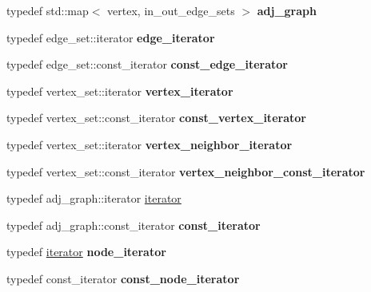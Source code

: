 \begin{DoxyCompactItemize}
typedef std\+::map$<$ vertex, in\+\_\+out\+\_\+edge\+\_\+sets $>$ {\bfseries adj\+\_\+graph}
\item 
\mbox{\label{class_n_graph_1_1t_graph_a1b710c759e101724f3544b374ebb0179}} 
typedef edge\+\_\+set\+::iterator {\bfseries edge\+\_\+iterator}
\item 
\mbox{\label{class_n_graph_1_1t_graph_a6e189d2dd98fbe980b830d898eea5247}} 
typedef edge\+\_\+set\+::const\+\_\+iterator {\bfseries const\+\_\+edge\+\_\+iterator}
\item 
\mbox{\label{class_n_graph_1_1t_graph_ad5c343cc3c50b291b35fb48147db3250}} 
typedef vertex\+\_\+set\+::iterator {\bfseries vertex\+\_\+iterator}
\item 
\mbox{\label{class_n_graph_1_1t_graph_a5ed9ca8ad9676b3c7abd3880f735ce80}} 
typedef vertex\+\_\+set\+::const\+\_\+iterator {\bfseries const\+\_\+vertex\+\_\+iterator}
\item 
\mbox{\label{class_n_graph_1_1t_graph_aeb3fd2cc092aa7ecb4b749ee4e78f9ab}} 
typedef vertex\+\_\+set\+::iterator {\bfseries vertex\+\_\+neighbor\+\_\+iterator}
\item 
\mbox{\label{class_n_graph_1_1t_graph_af8b0bc7076b28fb145b267b8faad195e}} 
typedef vertex\+\_\+set\+::const\+\_\+iterator {\bfseries vertex\+\_\+neighbor\+\_\+const\+\_\+iterator}
\item 
typedef adj\+\_\+graph\+::iterator \mbox{\hyperlink{class_n_graph_1_1t_graph_a6e446a33b74e5c0c39fb6c50a4f07cec}{iterator}}
\item 
\mbox{\label{class_n_graph_1_1t_graph_a64864813622245ff9412c784232f2f99}} 
typedef adj\+\_\+graph\+::const\+\_\+iterator {\bfseries const\+\_\+iterator}
\item 
\mbox{\label{class_n_graph_1_1t_graph_af9638aed082c5e33cf4064f158f66d59}} 
typedef \mbox{\hyperlink{class_n_graph_1_1t_graph_a6e446a33b74e5c0c39fb6c50a4f07cec}{iterator}} {\bfseries node\+\_\+iterator}
\item 
\mbox{\label{class_n_graph_1_1t_graph_a4a4c169ed8eecce822b2d18b21082ce7}} 
typedef const\+\_\+iterator {\bfseries const\+\_\+node\+\_\+iterator}
\end{DoxyCompactItemize}
